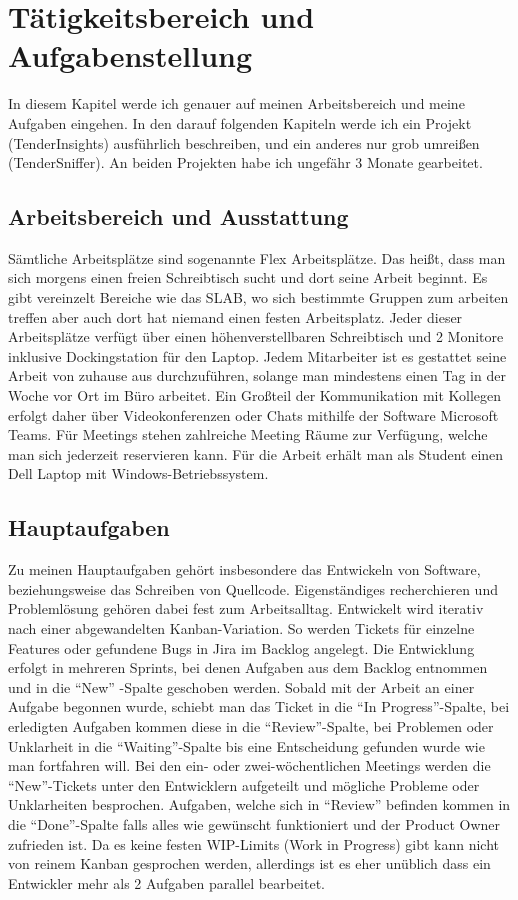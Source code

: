 \chapter{Tätigkeitsbereich und Aufgabenstellung}
In diesem Kapitel werde ich genauer auf meinen Arbeitsbereich und meine Aufgaben eingehen.
In den darauf folgenden Kapiteln werde ich ein Projekt (TenderInsights) ausführlich beschreiben, und ein anderes nur
grob umreißen (TenderSniffer). An beiden Projekten habe ich ungefähr 3 Monate gearbeitet.

\section{Arbeitsbereich und Ausstattung}
Sämtliche Arbeitsplätze sind sogenannte Flex Arbeitsplätze. Das heißt, dass man sich morgens einen freien Schreibtisch
sucht und dort seine Arbeit beginnt. Es gibt vereinzelt Bereiche wie das SLAB, wo sich bestimmte Gruppen zum arbeiten
treffen aber auch dort hat niemand einen festen Arbeitsplatz. Jeder dieser Arbeitsplätze verfügt über einen
höhenverstellbaren Schreibtisch und 2 Monitore inklusive Dockingstation für den Laptop. Jedem Mitarbeiter ist es
gestattet seine Arbeit von zuhause aus durchzuführen, solange man mindestens einen Tag in der Woche vor Ort im Büro
arbeitet. Ein Großteil der Kommunikation mit Kollegen erfolgt daher über Videokonferenzen oder Chats mithilfe der
Software Microsoft Teams. Für Meetings stehen zahlreiche Meeting Räume zur Verfügung, welche man sich jederzeit
reservieren kann. Für die Arbeit erhält man als Student einen Dell Laptop mit Windows-Betriebssystem. 


\section{Hauptaufgaben}
Zu meinen Hauptaufgaben gehört insbesondere das Entwickeln von Software, beziehungsweise das Schreiben von Quellcode.
Eigenständiges recherchieren und Problemlösung gehören dabei fest zum Arbeitsalltag. Entwickelt wird iterativ nach einer
abgewandelten Kanban-Variation. So werden Tickets für einzelne Features oder gefundene Bugs in Jira im Backlog angelegt.
Die Entwicklung erfolgt in mehreren Sprints, bei denen Aufgaben aus dem Backlog entnommen und in die "`New"' -Spalte
geschoben werden. Sobald mit der Arbeit an einer Aufgabe begonnen wurde, schiebt man das Ticket in die "`In
Progress"'-Spalte, bei erledigten Aufgaben kommen diese in die "`Review"'-Spalte, bei Problemen oder Unklarheit in die
"`Waiting"'-Spalte bis eine Entscheidung gefunden wurde wie man fortfahren will. Bei den ein- oder zwei-wöchentlichen
Meetings werden die "`New"'-Tickets unter den Entwicklern aufgeteilt und mögliche Probleme oder Unklarheiten besprochen.
Aufgaben, welche sich in "`Review"' befinden kommen in die "`Done"'-Spalte falls alles wie gewünscht funktioniert und der
Product Owner zufrieden ist. Da es keine festen WIP-Limits (Work in Progress) gibt kann nicht von reinem Kanban
gesprochen werden, allerdings ist es eher unüblich dass ein Entwickler mehr als 2 Aufgaben parallel bearbeitet.


